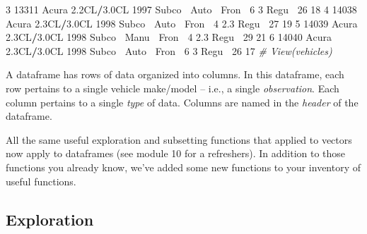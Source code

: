 \documentclass[
]{book}
\newenvironment{Shaded}{\begin{snugshade}}{\end{snugshade}}
\newcommand{\CommentTok}[1]{\textcolor[rgb]{0.56,0.35,0.01}{\textit{#1}}}
\newcommand{\DecValTok}[1]{\textcolor[rgb]{0.00,0.00,0.81}{#1}}
\newcommand{\FloatTok}[1]{\textcolor[rgb]{0.00,0.00,0.81}{#1}}
\newcommand{\NormalTok}[1]{#1}
\newcommand{\OperatorTok}[1]{\textcolor[rgb]{0.81,0.36,0.00}{\textbf{#1}}}
\newcommand{\StringTok}[1]{\textcolor[rgb]{0.31,0.60,0.02}{#1}}
\begin{document}
\begin{Shaded}
\begin{Highlighting}[]
\DecValTok{3} \DecValTok{13311}\NormalTok{ Acura }\FloatTok{2.2}\NormalTok{CL}\OperatorTok{/}\FloatTok{3.0}\NormalTok{CL  }\DecValTok{1997}\NormalTok{ Subco}\OperatorTok{~}\StringTok{ }\NormalTok{Auto}\OperatorTok{~}\StringTok{ }\NormalTok{Fron}\OperatorTok{~}\StringTok{     }\DecValTok{6}   \DecValTok{3}\NormalTok{   Regu}\OperatorTok{~}\StringTok{    }\DecValTok{26}    \DecValTok{18}
\DecValTok{4} \DecValTok{14038}\NormalTok{ Acura }\FloatTok{2.3}\NormalTok{CL}\OperatorTok{/}\FloatTok{3.0}\NormalTok{CL  }\DecValTok{1998}\NormalTok{ Subco}\OperatorTok{~}\StringTok{ }\NormalTok{Auto}\OperatorTok{~}\StringTok{ }\NormalTok{Fron}\OperatorTok{~}\StringTok{     }\DecValTok{4}   \FloatTok{2.3}\NormalTok{ Regu}\OperatorTok{~}\StringTok{    }\DecValTok{27}    \DecValTok{19}
\DecValTok{5} \DecValTok{14039}\NormalTok{ Acura }\FloatTok{2.3}\NormalTok{CL}\OperatorTok{/}\FloatTok{3.0}\NormalTok{CL  }\DecValTok{1998}\NormalTok{ Subco}\OperatorTok{~}\StringTok{ }\NormalTok{Manu}\OperatorTok{~}\StringTok{ }\NormalTok{Fron}\OperatorTok{~}\StringTok{     }\DecValTok{4}   \FloatTok{2.3}\NormalTok{ Regu}\OperatorTok{~}\StringTok{    }\DecValTok{29}    \DecValTok{21}
\DecValTok{6} \DecValTok{14040}\NormalTok{ Acura }\FloatTok{2.3}\NormalTok{CL}\OperatorTok{/}\FloatTok{3.0}\NormalTok{CL  }\DecValTok{1998}\NormalTok{ Subco}\OperatorTok{~}\StringTok{ }\NormalTok{Auto}\OperatorTok{~}\StringTok{ }\NormalTok{Fron}\OperatorTok{~}\StringTok{     }\DecValTok{6}   \DecValTok{3}\NormalTok{   Regu}\OperatorTok{~}\StringTok{    }\DecValTok{26}    \DecValTok{17}
\CommentTok{# View(vehicles)}
\end{Highlighting}
\end{Shaded}

A dataframe has rows of data organized into columns. In this dataframe, each row pertains to a single vehicle make/model -- i.e., a single \emph{observation}. Each column pertains to a single \emph{type} of data. Columns are named in the \emph{header} of the dataframe.

All the same useful exploration and subsetting functions that applied to vectors now apply to dataframes (see module 10 for a refreshers). In addition to those functions you already know, we've added some new functions to your inventory of useful functions.

\hypertarget{exploration}{%
\subsection*{Exploration}\label{exploration}}
\end{document}
